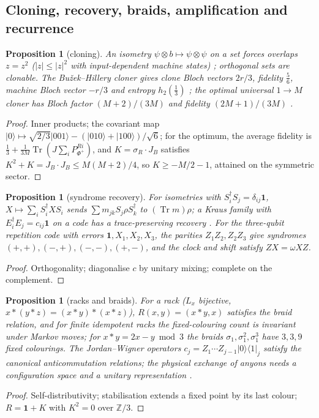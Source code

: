 \documentclass[aps,pra,onecolumn,superscriptaddress,nofootinbib,10pt]{revtex4-2}
\newtheorem{proposition}[theorem]{Proposition}
\theoremstyle{definition}
\theoremstyle{remark}
\newcommand{\Z}{\mathbb{Z}}
\newcommand{\tr}{\operatorname{Tr}}
\begin{document}
\subsection{Cloning, recovery, braids, amplification and recurrence}\label{sec:bdmisc}

\begin{proposition}[cloning]\label{prop:bdclone}
An isometry $\psi\otimes b\mapsto\psi\otimes\psi$ on a set forces overlaps $z=z^2$ ($\lvert z\rvert\le\lvert z\rvert^2$ with input-dependent machine states) \cite{n4:WZ,n4:Dieks};
orthogonal sets are clonable.  The Bu\v{z}ek--Hillery cloner gives clone Bloch vectors $2r/3$, fidelity $\tfrac56$, machine Bloch
vector $-r/3$ and entropy $h_2(\tfrac13)$ \cite{n4:BH}; the optimal universal $1\to M$ cloner has Bloch factor $(M+2)/(3M)$ and fidelity
$(2M+1)/(3M)$ \cite{n4:GM}.
\end{proposition}
\begin{proof}
Inner products; the covariant map $\lvert0\rangle\mapsto\sqrt{2/3}\lvert001\rangle-(\lvert010\rangle+\lvert100\rangle)/\sqrt6$; for the optimum, the average fidelity is
$\tfrac13+\tfrac1{3M}\tr(J\sum_iP^{Ri}_{\Phi^+})$, and $K=\sigma_R\cdot J_B$ satisfies $K^2+K=J_B\cdot J_B\le M(M+2)/4$, so $K\ge-M/2-1$, attained on the symmetric sector.
\end{proof}

\begin{proposition}[syndrome recovery]\label{prop:bdrecovery}
For isometries with $S_i^\dagger S_j=\delta_{ij}\mathbf1$, $X\mapsto\sum_iS_i^\dagger XS_i$ sends $\sum m_{jk}S_j\rho S_k^\dagger$ to $(\tr m)\rho$; a Kraus family with $E_i^\dagger E_j=c_{ij}\mathbf1$ on a code
has a trace-preserving recovery \cite{n4:KL}.  For the three-qubit repetition code with errors $\mathbf1,X_1,X_2,X_3$, the parities
$Z_1Z_2,Z_2Z_3$ give syndromes $(+,+),(-,+),(-,-),(+,-)$, and the clock and shift satisfy $ZX=\omega XZ$.
\end{proposition}
\begin{proof}
Orthogonality; diagonalise $c$ by unitary mixing; complete on the complement.
\end{proof}

\begin{proposition}[racks and braids]\label{prop:bdbraid}
For a rack ($L_x$ bijective, $x*(y*z)=(x*y)*(x*z)$), $R(x,y)=(x*y,x)$ satisfies the braid relation, and for finite idempotent racks
the fixed-colouring count is invariant under Markov moves; for $x*y=2x-y\bmod3$ the braids $\sigma_1,\sigma_1^2,\sigma_1^3$ have $3,3,9$ fixed
colourings.  The Jordan--Wigner operators $c_j=Z_1\cdots Z_{j-1}\lvert0\rangle\langle1\rvert_j$ satisfy the canonical anticommutation relations; the
physical exchange of anyons needs a configuration space and a unitary representation \cite{n4:Nayak}.
\end{proposition}
\begin{proof}
Self-distributivity; stabilisation extends a fixed point by its last colour; $R=\mathbf1+K$ with $K^2=0$ over $\Z/3$.
\end{proof}
\end{document}

